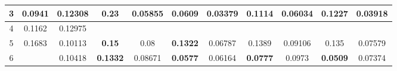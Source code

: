 \begin{table}[htbp]
{\begin{tabular}{@{}ccccccccccc@{}}
    \multicolumn{1}{c|}{3}        & \multicolumn{1}{c|}{0.0941}                                                         & \multicolumn{1}{c||}{0.12308}                                   & \multicolumn{1}{c|}{0.23}                                    & \multicolumn{1}{c||}{\cellcolor[HTML]{32CB00}\textbf{0.05855}} & \multicolumn{1}{c|}{0.0609}                                  & \multicolumn{1}{c||}{\cellcolor[HTML]{32CB00}\textbf{0.03379}}                                  & \multicolumn{1}{c|}{0.1114}                                  & \multicolumn{1}{c||}{\cellcolor[HTML]{32CB00}\textbf{0.06034}}                                  & \multicolumn{1}{c|}{0.1227}                                  & \multicolumn{1}{c|}{\cellcolor[HTML]{32CB00}\textbf{0.03918}} \\ \midrule
    \multicolumn{1}{c|}{4}        & \multicolumn{1}{c|}{0.1162}                                                         & \multicolumn{1}{c||}{0.12975}                                   & \multicolumn{8}{c}{}                                                                                                                                                                                                                                                                                                                                                                                                                                                                                                      \\ \midrule \midrule
    \multicolumn{1}{c|}{5}        & \multicolumn{1}{c|}{0.1683}                                                         & \multicolumn{1}{c||}{0.10113}                                   & \multicolumn{1}{c|}{\cellcolor[HTML]{32CB00}\textbf{0.15}}   & \multicolumn{1}{c||}{0.08}                                     & \multicolumn{1}{c|}{\cellcolor[HTML]{FD6864}\textbf{0.1322}} & \multicolumn{1}{c||}{0.06787}                                  & \multicolumn{1}{c|}{0.1389}                                  & \multicolumn{1}{c||}{0.09106}                                  & \multicolumn{1}{c|}{0.135}                                   & \multicolumn{1}{c|}{0.07579}                                  \\ \midrule
    \multicolumn{1}{c|}{6}        & \multicolumn{1}{c|}{\cellcolor[HTML]{32CB00}{\color[HTML]{000000} \textbf{0.0741}}} & \multicolumn{1}{c||}{0.10418}                                   & \multicolumn{1}{c|}{\cellcolor[HTML]{32CB00}\textbf{0.1332}} & \multicolumn{1}{c||}{0.08671}                                  & \multicolumn{1}{c|}{\cellcolor[HTML]{32CB00}\textbf{0.0577}} & \multicolumn{1}{c||}{0.06164}                                  & \multicolumn{1}{c|}{\cellcolor[HTML]{32CB00}\textbf{0.0777}} & \multicolumn{1}{c||}{0.0973}                                   & \multicolumn{1}{c|}{\cellcolor[HTML]{32CB00}\textbf{0.0509}} & \multicolumn{1}{c|}{0.07374}                                  \\ \midrule

\end{tabular}}
\end{table}
